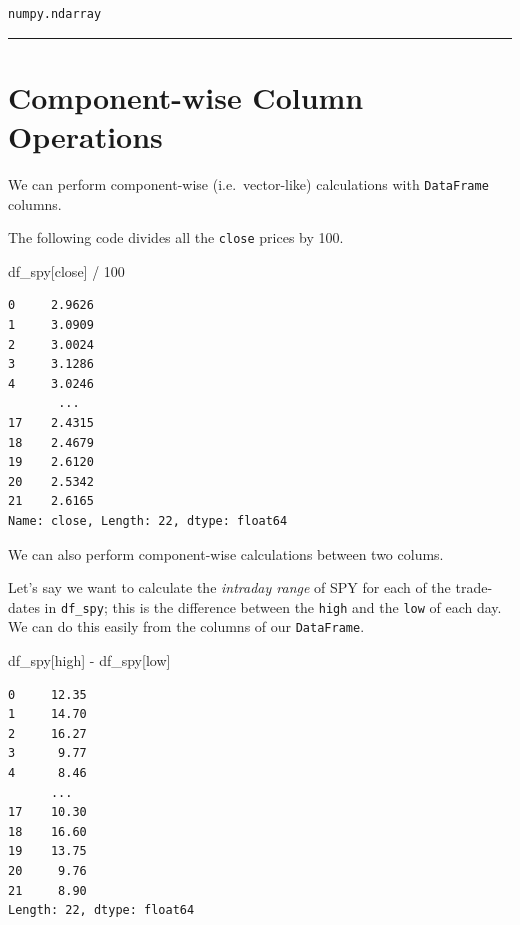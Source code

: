 \documentclass[
  letterpaper,
  DIV=11,
  numbers=noendperiod]{scrreprt}
\newenvironment{Shaded}{\begin{snugshade}}{\end{snugshade}}
\newcommand{\DecValTok}[1]{\textcolor[rgb]{0.68,0.00,0.00}{#1}}
\newcommand{\NormalTok}[1]{\textcolor[rgb]{0.00,0.23,0.31}{#1}}
\newcommand{\OperatorTok}[1]{\textcolor[rgb]{0.37,0.37,0.37}{#1}}
\newcommand{\StringTok}[1]{\textcolor[rgb]{0.13,0.47,0.30}{#1}}
\begin{document}
\begin{verbatim}
numpy.ndarray
\end{verbatim}

\begin{center}\rule{0.5\linewidth}{0.5pt}\end{center}

\hypertarget{component-wise-column-operations}{%
\section{Component-wise Column
Operations}\label{component-wise-column-operations}}

We can perform component-wise (i.e.~vector-like) calculations with
\texttt{DataFrame} columns.

The following code divides all the \texttt{close} prices by 100.

\begin{Shaded}
\begin{Highlighting}[]
\NormalTok{df\_spy[}\StringTok{\textquotesingle{}close\textquotesingle{}}\NormalTok{] }\OperatorTok{/} \DecValTok{100}
\end{Highlighting}
\end{Shaded}

\begin{verbatim}
0     2.9626
1     3.0909
2     3.0024
3     3.1286
4     3.0246
       ...  
17    2.4315
18    2.4679
19    2.6120
20    2.5342
21    2.6165
Name: close, Length: 22, dtype: float64
\end{verbatim}

We can also perform component-wise calculations between two colums.

Let's say we want to calculate the \emph{intraday range} of SPY for each
of the trade-dates in \texttt{df\_spy}; this is the difference between
the \texttt{high} and the \texttt{low} of each day. We can do this
easily from the columns of our \texttt{DataFrame}.

\begin{Shaded}
\begin{Highlighting}[]
\NormalTok{df\_spy[}\StringTok{\textquotesingle{}high\textquotesingle{}}\NormalTok{] }\OperatorTok{{-}}\NormalTok{ df\_spy[}\StringTok{\textquotesingle{}low\textquotesingle{}}\NormalTok{]}
\end{Highlighting}
\end{Shaded}

\begin{verbatim}
0     12.35
1     14.70
2     16.27
3      9.77
4      8.46
      ...  
17    10.30
18    16.60
19    13.75
20     9.76
21     8.90
Length: 22, dtype: float64
\end{verbatim}
\end{document}
